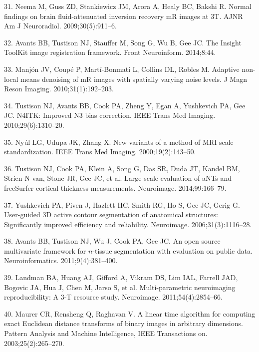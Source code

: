 \documentclass[11pt,]{article}
\begin{document}
\hypertarget{ref-Neema:2009aa}{}
31. Neema M, Guss ZD, Stankiewicz JM, Arora A, Healy BC, Bakshi R.
Normal findings on brain fluid-attenuated inversion recovery mR images
at 3T. AJNR Am J Neuroradiol. 2009;30(5):911--6.

\hypertarget{ref-Avants:2014aa}{}
32. Avants BB, Tustison NJ, Stauffer M, Song G, Wu B, Gee JC. The
Insight ToolKit image registration framework. Front Neuroinform.
2014;8:44.

\hypertarget{ref-Manjon:2010aa}{}
33. Manjón JV, Coupé P, Martí-Bonmatí L, Collins DL, Robles M. Adaptive
non-local means denoising of mR images with spatially varying noise
levels. J Magn Reson Imaging. 2010;31(1):192--203.

\hypertarget{ref-Tustison:2010ac}{}
34. Tustison NJ, Avants BB, Cook PA, Zheng Y, Egan A, Yushkevich PA, Gee
JC. N4ITK: Improved N3 bias correction. IEEE Trans Med Imaging.
2010;29(6):1310--20.

\hypertarget{ref-nyul2000}{}
35. Nyúl LG, Udupa JK, Zhang X. New variants of a method of MRI scale
standardization. IEEE Trans Med Imaging. 2000;19(2):143--50.

\hypertarget{ref-Tustison:2014ab}{}
36. Tustison NJ, Cook PA, Klein A, Song G, Das SR, Duda JT, Kandel BM,
Strien N van, Stone JR, Gee JC, et al. Large-scale evaluation of aNTs
and freeSurfer cortical thickness measurements. Neuroimage.
2014;99:166--79.

\hypertarget{ref-Yushkevich:2006aa}{}
37. Yushkevich PA, Piven J, Hazlett HC, Smith RG, Ho S, Gee JC, Gerig G.
User-guided 3D active contour segmentation of anatomical structures:
Significantly improved efficiency and reliability. Neuroimage.
2006;31(3):1116--28.

\hypertarget{ref-Avants:2011aa}{}
38. Avants BB, Tustison NJ, Wu J, Cook PA, Gee JC. An open source
multivariate framework for \(n\)-tissue segmentation with evaluation on
public data. Neuroinformatics. 2011;9(4):381--400.

\hypertarget{ref-landman2011}{}
39. Landman BA, Huang AJ, Gifford A, Vikram DS, Lim IAL, Farrell JAD,
Bogovic JA, Hua J, Chen M, Jarso S, et al. Multi-parametric neuroimaging
reproducibility: A 3-T resource study. Neuroimage. 2011;54(4):2854--66.

\hypertarget{ref-maurer2003}{}
40. Maurer CR, Rensheng Q, Raghavan V. A linear time algorithm for
computing exact Euclidean distance transforms of binary images in
arbitrary dimensions. Pattern Analysis and Machine Intelligence, IEEE
Transactions on. 2003;25(2):265--270.
\end{document}

